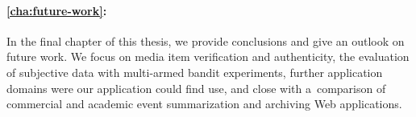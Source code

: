 \paragraph{\autoref{cha:future-work}:}

In the final chapter of this thesis,
we provide conclusions and give an outlook on future work.
We focus on media item verification and authenticity,
the evaluation of subjective data with multi-armed bandit experiments,
further application domains were our application could find use,
and close with a~comparison of commercial and academic event summarization
and archiving Web applications.


\clearpage

